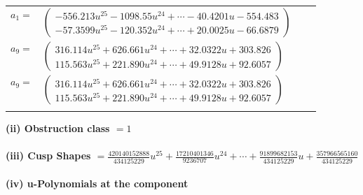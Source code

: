 \documentclass[1p]{elsarticle_modified}
\theoremstyle{definition}
\begin{document}
\begin{tabular}{m{7pt} m{180pt} m{7pt} m{180pt} }
\flushright $a_{1}=$&$\begin{pmatrix}-556.213 u^{25}-1098.55 u^{24}+\cdots-40.4201 u-554.483\\-57.3599 u^{25}-120.352 u^{24}+\cdots+20.0025 u-66.6879\end{pmatrix}$ \\
\flushright $a_{9}=$&$\begin{pmatrix}316.114 u^{25}+626.661 u^{24}+\cdots+32.0322 u+303.826\\115.563 u^{25}+221.890 u^{24}+\cdots+49.9128 u+92.6057\end{pmatrix}$\\ \flushright $a_{9}=$&$\begin{pmatrix}316.114 u^{25}+626.661 u^{24}+\cdots+32.0322 u+303.826\\115.563 u^{25}+221.890 u^{24}+\cdots+49.9128 u+92.6057\end{pmatrix}$\\&\end{tabular}
\flushleft \textbf{(ii) Obstruction class $= 1$}\\~\\
\flushleft \textbf{(iii) Cusp Shapes $= \frac{420140152888}{434125229} u^{25}+\frac{17210401346}{9236707} u^{24}+\cdots+\frac{91899682153}{434125229} u+\frac{357966565160}{434125229}$}\\~\\
\newpage\renewcommand{\arraystretch}{1}
\flushleft \textbf{(iv) u-Polynomials at the component}\newline \\
\end{document}
